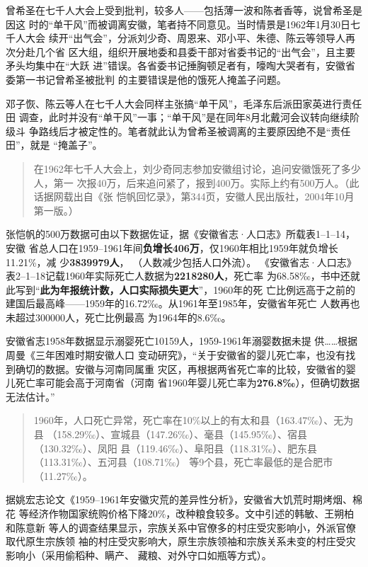 曾希圣在七千人大会上受到批判，较多人——包括薄一波和陈者香等，说曾希圣是因这
时的“单干风”而被调离安徽，笔者持不同意见。当时情景是1962年1月30日七千人大会
续开“出气会”，分派刘少奇、周恩来、邓小平、朱德、陈云等领导人再次分赴几个省
区大组，组织开展地委和县委干部对省委书记的“出气会”，且主要矛头均集中在“大跃
进”错误。各省委书记捶胸顿足者有，嚎啕大哭者有，安徽省委第一书记曾希圣被批判
的主要错误是他的饿死人掩盖子问题。

邓子恢、陈云等人在七千人大会同样主张搞“单干风”，毛泽东后派田家英进行责任田
调查，此时并没有“单干风”一事；“单干风”是在同年8月北戴河会议转向继续阶级斗
争路线后才被定性的。笔者就此认为曾希圣被调离的主要原因绝不是“责任田”，就是
“掩盖子”。

\begin{quotation}
  在1962年七千人大会上，刘少奇同志参加安徽组讨论，追问安徽饿死了多少人，第一
  次报40万，后来追问紧了，报到400万。实际上约有500万人。（此话据网载出自《张
  恺帆回忆录》，第344页，安徽人民出版社，2004年10月第一版。）
\end{quotation}

张恺帆的500万数据可由以下数据佐证，据《安徽省志·人口志》所载表1--1--14，安徽
省总人口在1959--1961年间\textbf{负增长406万}，仅1960年相比1959年就负增长11.21\%，减
少\textbf{3839979人}， （人数减少包括人口外流）。
《安徽省志·人口志》表2--1--18记载1960年实际死亡人数据为\textbf{2218280人}，死亡率
为68.58‰，书中还就此写到“\textbf{此为年报统计数，人口实际损失更大}”，1960年的死
亡比例远高于之前的建国后最高峰——1959年的16.72‰。从1961年至1985年，安徽省年死亡
人数再也未超过300000人，死亡比例最高
为1964年的8.6‰。

安徽省志1958年数据显示溺婴死亡10159人，1959-1961年溺婴数据未提
供……根据周曼《三年困难时期安徽人口
变动研究》，“关于安徽省的婴儿死亡率，也没有找到确切的数据。安徽与河南同属重
灾区，再根据两省死亡率的比较，安徽省的婴儿死亡率可能会高于河南省（河南
省1960年婴儿死亡率为\textbf{276.8‰}），但确切数据无法估计。”

\begin{quotation}
  1960年，人口死亡异常，死亡率在10\%以上的有太和县（163.47‰）、无为县
  （158.29‰）、宣城县（147.26‰）、毫县（145.95‰）、宿县（130.32‰）、凤阳
  县（119.46‰）、阜阳县（118.31‰）、肥东县（113.31‰）、五河县（108.71‰）
  等9个县，死亡率最低的是合肥市（11.27‰）。
\end{quotation}

据姚宏志论文《1959--1961年安徽灾荒的差异性分析》，安徽省大饥荒时期烤烟、棉花
等经济作物国家统购价格下降20\%，改种粮食较多。文中引述的韩敏、王朔柏和陈意新
等人的调查结果显示，宗族关系中官僚多的村庄受灾影响小，外派官僚取代原生宗族领
袖的村庄受灾影响大，原生宗族领袖和宗族关系未变的村庄受灾影响小（采用偷稻种、瞒产、
藏粮、对外守口如瓶等方式）。

